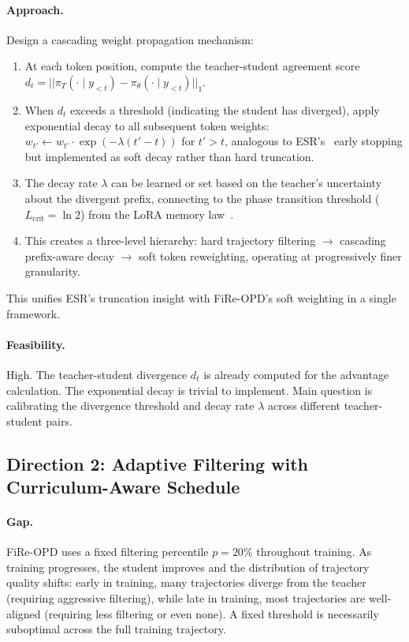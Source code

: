 \documentclass[11pt,a4paper]{article}
\begin{document}
\paragraph{Approach.} Design a cascading weight propagation mechanism:
\begin{enumerate}
\item At each token position, compute the teacher-student agreement score $d_t = ||\pi_T(\cdot \mid y_{<t}) - \pi_\theta(\cdot \mid y_{<t})||_1$.
\item When $d_t$ exceeds a threshold (indicating the student has diverged), apply exponential decay to all subsequent token weights: $w_{t'} \leftarrow w_{t'} \cdot \exp(-\lambda(t' - t))$ for $t' > t$, analogous to ESR's~\cite{esr2026} early stopping but implemented as soft decay rather than hard truncation.
\item The decay rate $\lambda$ can be learned or set based on the teacher's uncertainty about the divergent prefix, connecting to the phase transition threshold ($L_{\mathrm{crit}} = \ln 2$) from the LoRA memory law~\cite{xu2026lora}.
\item This creates a three-level hierarchy: hard trajectory filtering $\to$ cascading prefix-aware decay $\to$ soft token reweighting, operating at progressively finer granularity.
\end{enumerate}
This unifies ESR's truncation insight with FiRe-OPD's soft weighting in a single framework.

\paragraph{Feasibility.} High. The teacher-student divergence $d_t$ is already computed for the advantage calculation. The exponential decay is trivial to implement. Main question is calibrating the divergence threshold and decay rate $\lambda$ across different teacher-student pairs.

\subsection{Direction 2: Adaptive Filtering with Curriculum-Aware Schedule}

\paragraph{Gap.} FiRe-OPD uses a fixed filtering percentile $p{=}20\%$ throughout training. As training progresses, the student improves and the distribution of trajectory quality shifts: early in training, many trajectories diverge from the teacher (requiring aggressive filtering), while late in training, most trajectories are well-aligned (requiring less filtering or even none). A fixed threshold is necessarily suboptimal across the full training trajectory.
\end{document}
